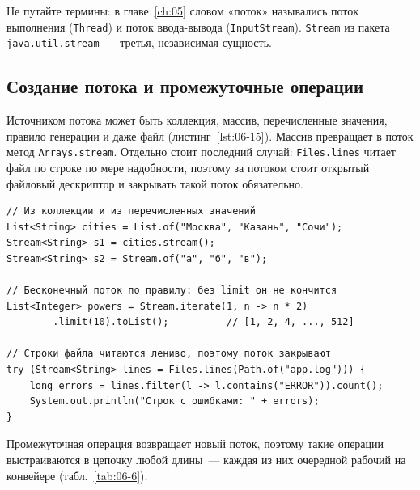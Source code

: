 Не путайте термины: в главе~\ref{ch:05} словом «поток» назывались поток
выполнения (\texttt{Thread}) и поток ввода-вывода (\texttt{InputStream}).
\texttt{Stream} из пакета \texttt{java.util.stream}~--- третья, независимая
сущность.

\subsection{Создание потока и промежуточные операции}

Источником потока может быть коллекция, массив, перечисленные значения,
правило генерации и даже файл (листинг~\ref{lst:06-15}). Массив превращает в
поток метод \texttt{Arrays.stream}. Отдельно стоит последний случай:
\texttt{Files.lines} читает файл по строке по мере надобности, поэтому за
потоком стоит открытый файловый дескриптор и закрывать такой поток
обязательно.

\begin{listing}[H]
\begin{verbatim}
// Из коллекции и из перечисленных значений
List<String> cities = List.of("Москва", "Казань", "Сочи");
Stream<String> s1 = cities.stream();
Stream<String> s2 = Stream.of("а", "б", "в");

// Бесконечный поток по правилу: без limit он не кончится
List<Integer> powers = Stream.iterate(1, n -> n * 2)
        .limit(10).toList();          // [1, 2, 4, ..., 512]

// Строки файла читаются лениво, поэтому поток закрывают
try (Stream<String> lines = Files.lines(Path.of("app.log"))) {
    long errors = lines.filter(l -> l.contains("ERROR")).count();
    System.out.println("Строк с ошибками: " + errors);
}
\end{verbatim}
\caption{Способы получить поток}
\label{lst:06-15}
\end{listing}

Промежуточная операция возвращает новый поток, поэтому такие операции
выстраиваются в цепочку любой длины~--- каждая из них очередной рабочий на
конвейере (табл.~\ref{tab:06-6}).

